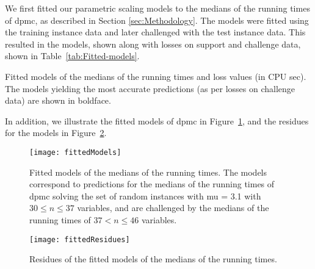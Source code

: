 We first fitted our parametric scaling models to the
medians of the
 running times
of dpmc, as described in Section \ref{sec:Methodology}. The
models were fitted using the training instance data and later
challenged with the test instance data.
This resulted in the models, shown along with losses on support and
challenge data, shown in Table~\ref{tab:Fitted-models}.
\begin{table}[tb]
\begin{centering}

% 
\par\end{centering}

\caption{\label{tab:Fitted-models}Fitted models of the medians
of the  running
times and loss
values (in CPU sec). The models yielding the most
accurate predictions (as per losses on challenge data) are shown in
boldface.}
\end{table}
In addition, we illustrate the fitted models of dpmc in
Figure~\ref{fig:Fitted-models},
and the residues for the models in Figure~\ref{fig:Fitted-residues}.
\begin{figure}[tb]
\noindent \begin{centering}
\texttt{[image: fittedModels]}
\par\end{centering}

\caption{\label{fig:Fitted-models} Fitted models of the medians of the
 running times.
The models correspond to predictions for the medians of the
 running times of
dpmc solving the set of random instances with mu = 3.1
with $30\leq n\leq 37$ variables, and are challenged by the medians of
the 
running times of $37< n \leq 46$ variables.}
\end{figure}


\begin{figure}[tb]
\noindent \begin{centering}
\texttt{[image: fittedResidues]}
\par\end{centering}

\caption{\label{fig:Fitted-residues} Residues of the fitted models of the
medians of the 
running times. }
\end{figure}


